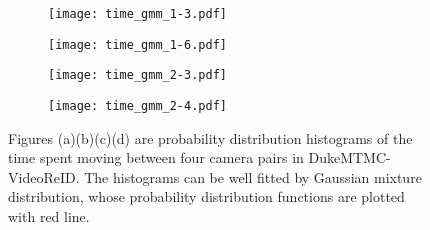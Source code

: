 \documentclass[10pt,twocolumn,letterpaper]{article}
\begin{document}
\begin{figure}
  \begin{subfigure}[t]{.23\textwidth}
    \centering
    \texttt{[image: time\_gmm\_1-3.pdf]}
    \caption{}
  \end{subfigure}
  \hfill
  \begin{subfigure}[t]{.23\textwidth}
    \centering
    \texttt{[image: time\_gmm\_1-6.pdf]}
    \caption{}
  \end{subfigure}

  \medskip

  \begin{subfigure}[t]{.23\textwidth}
    \centering
    \texttt{[image: time\_gmm\_2-3.pdf]}
    \caption{}
  \end{subfigure}
  \hfill
  \begin{subfigure}[t]{.23\textwidth}
    \centering
    \texttt{[image: time\_gmm\_2-4.pdf]}
    \caption{}
  \end{subfigure}
  
  \caption{Figures (a)(b)(c)(d) are probability distribution histograms of the time spent moving between four camera pairs in DukeMTMC-VideoReID. The histograms can be well fitted by Gaussian mixture distribution, whose probability distribution functions are plotted with red line.}
  \label{fig:gmm}
\end{figure}
\end{document}
